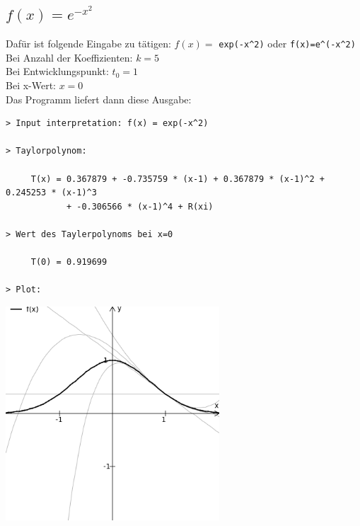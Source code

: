 \documentclass{scrartcl}
\begin{document}
\subsection{$f(x)=e^{-x^2}$}
Dafür ist folgende Eingabe zu tätigen: $f(x)=$ \texttt{exp(-x\^{ }2)} oder \texttt{f(x)=e\^{ }(-x\^{ }2)}\\
Bei Anzahl der Koeffizienten: $k=5$\\
Bei Entwicklungspunkt: $t_0=1$\\
Bei x-Wert: $x=0$\\
Das Programm liefert dann diese Ausgabe:
\begin{verbatim}
> Input interpretation: f(x) = exp(-x^2)
 
> Taylorpolynom: 

     T(x) = 0.367879 + -0.735759 * (x-1) + 0.367879 * (x-1)^2 + 0.245253 * (x-1)^3
            + -0.306566 * (x-1)^4 + R(xi)

> Wert des Taylerpolynoms bei x=0

     T(0) = 0.919699

> Plot:
\end{verbatim}

\begin{center}
\includegraphics[width=8cm]{./png/plot_gauss.png}
\end{center}

\newpage
\end{document}
